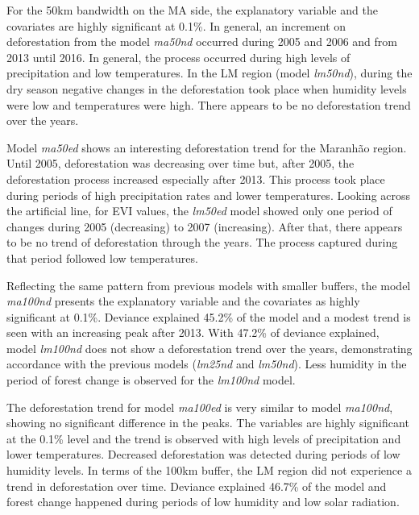 For the 50km bandwidth on the MA side, the explanatory variable and the covariates are highly significant at 0.1\%. In general, an increment on deforestation from the model \textit{ma50nd} occurred during 2005 and 2006 and from 2013 until 2016. In general, the process occurred during high levels of precipitation and low temperatures. In the LM region (model \textit{lm50nd}), during the dry season negative changes in the deforestation  took place when humidity levels were low and temperatures were high. There appears to be no deforestation trend over the years.  

Model \textit{ma50ed} shows an interesting deforestation trend for the Maranhão region. Until 2005, deforestation was decreasing over time but, after 2005, the deforestation process increased especially after 2013. This process took place during periods of high precipitation rates and lower temperatures. Looking across the artificial line, for EVI values, the \textit{lm50ed} model showed only one period of changes during 2005 (decreasing) to 2007 (increasing). After that, there appears to be no trend of deforestation through the years. The process captured during that period followed low temperatures.  

Reflecting the same pattern from previous models with smaller buffers, the model \textit{ma100nd} presents the explanatory variable and the covariates as highly significant at 0.1\%. Deviance explained 45.2\% of the model and a modest trend is seen with an increasing peak after 2013. With 47.2\% of deviance explained, model \textit{lm100nd} does not show a deforestation trend over the years, demonstrating accordance with the previous models (\textit{lm25nd} and \textit{lm50nd}). Less humidity in the period of forest change is observed for the \textit{lm100nd} model. 

The deforestation trend for model \textit{ma100ed} is very similar to model \textit{ma100nd}, showing no significant difference in the peaks. The variables are highly significant at the 0.1\% level and the trend is observed with high levels of precipitation and lower temperatures. Decreased deforestation was detected during periods of low humidity levels. In terms of the 100km buffer, the LM region did not experience a trend in deforestation over time. Deviance explained 46.7\% of the model and forest change happened during periods of low humidity and low solar radiation.

